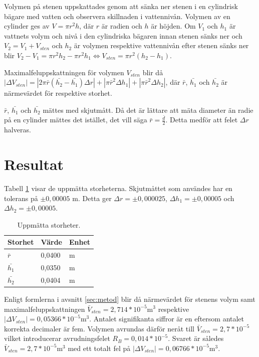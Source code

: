 \documentclass[titlepage, a4paper]{article}
\begin{document}
Volymen på stenen uppskattades genom att sänka ner stenen i en cylindrisk bägare med vatten och observera skillnaden i vattennivån. Volymen av en cylinder ges av $V=\pi r^2h$, där $r$ är radien och $h$ är höjden. Om $V_1$ och $h_1$ är vattnets volym och nivå i den cylindriska bägaren innan stenen sänks ner och $V_2=V_1 + V_{sten}$ och $h_2$ är volymen respektive vattennivån efter stenen sänks ner blir $V_2 - V_1 = \pi r^2h_2 - \pi r^2h_1 \Leftrightarrow V_{sten} = \pi r^2(h_2 - h_1)$.

Maximalfeluppskattningen för volymen $V_{sten}$ blir då $|\Delta V_{sten}| = |2\pi \bar{r}(\bar{h_2} - \bar{h_1})\Delta r| + |\pi \bar{r}^2\Delta h_1| + |\pi \bar{r}^2\Delta h_2|$, där $\bar{r}$, $\bar{h_1}$ och $\bar{h_2}$ är närmevärdet för respektive storhet.

$\bar{r}$, $\bar{h_1}$ och $\bar{h_2}$ mättes med skjutmått. Då det är lättare att mäta diameter än radie på en cylinder mättes det istället, det vill säga  $\bar{r} = \frac{\bar{d}}{2}$. Detta medför att felet $\Delta r$ halveras.

\section{Resultat}
Tabell \ref{tab:storheter} visar de uppmätta storheterna. Skjutmåttet som användes har en tolerans på $\pm 0,00005$ m. Detta ger $\Delta r = \pm 0,000025$, $\Delta h_1 = \pm 0,00005$ och $\Delta h_2 = \pm 0,00005$.

\begin{table}[h]
  \centering
  \begin{tabular}{|l|l|l|}
    \hline
    \textbf{Storhet} & \textbf{Värde} & \textbf{Enhet}\\ \hline
    $\bar{r}$ & 0,0400 & m\\ \hline
    $\bar{h_1}$ & 0,0350 & m\\ \hline
    $\bar{h_2}$ & 0,0404 & m\\ \hline
  \end{tabular}
  \caption{Uppmätta storheter.}
  \label{tab:storheter}
\end{table}

\clearpage
Enligt formlerna i avsnitt \ref{sec:metod} blir då närmevärdet för stenens volym samt maximalfeluppskattningen $\bar{V}_{sten} = 2,714*10^{-5} \text{m}^3$ respektive $|\Delta V_{sten}| = 0,05366*10^{-5} \text{m}^3$. Antalet signifikanta siffror är en eftersom antalet korrekta decimaler är fem. Volymen avrundas därför neråt till $\bar{V}_{sten} = 2,7*10^{-5}$ vilket introducerar avrudningsfelet $R_B = 0,014*10^{-5}$. Svaret är således $\bar{V}_{sten} = 2,7*10^{-5} \text{m}^3$ med ett totalt fel på $|\Delta V_{sten}| = 0,06766*10^{-5} \text{m}^3$.
\end{document}
